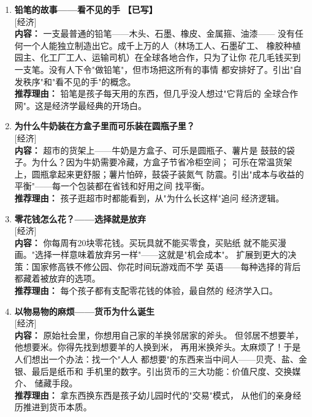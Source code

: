 \documentclass[a4paper,12pt]{ctexart}
\newcommand{\tageconomics}{\textcolor{economics}{\small [经济]}}
\newcommand{\done}{\textcolor{donegreen}{\textbf{【已写】}}}
\begin{document}
\begin{enumerate}

\item[\textbf{第1课}] \textbf{铅笔的故事——看不见的手} \done \\
\tageconomics \\
\textbf{内容：} 一支最普通的铅笔——木头、石墨、橡皮、金属箍、油漆——
没有任何一个人能独立制造出它。成千上万的人（林场工人、石墨矿工、
橡胶种植园主、化工厂工人、运输司机）在全球各地合作，只为了让你
花几毛钱买到一支笔。没有人下令"做铅笔"，但市场把这所有的事情
都安排好了。引出"自发秩序"和"看不见的手"的概念。\\
\textbf{推荐理由：} 铅笔是孩子每天用的东西，但几乎没人想过"它背后的
全球合作网"。这是经济学最经典的开场白。

\item[\textbf{第2课}] \textbf{为什么牛奶装在方盒子里而可乐装在圆瓶子里？} \\
\tageconomics \\
\textbf{内容：} 超市的货架上——牛奶是方盒子、可乐是圆瓶子、薯片是
鼓鼓的袋子。为什么？因为牛奶需要冷藏，方盒子节省冷柜空间；
可乐在常温货架上，圆瓶拿起来更舒服；薯片怕碎，鼓袋子装氮气
防震。引出"成本与收益的平衡"——每一个包装都在省钱和好用之间
找平衡。\\
\textbf{推荐理由：} 孩子逛超市时都能看到，从"为什么长这样"追问
经济逻辑。

\item[\textbf{第3课}] \textbf{零花钱怎么花？——选择就是放弃} \\
\tageconomics \\
\textbf{内容：} 你每周有20块零花钱。买玩具就不能买零食，买贴纸
就不能买漫画。"选择一样意味着放弃另一样"——这就是"机会成本"。
扩展到更大的决策：国家修高铁不修公园、你花时间玩游戏而不学
英语——每种选择的背后都藏着被放弃的选项。\\
\textbf{推荐理由：} 每个孩子都有支配零花钱的体验，最自然的
经济学入口。

\item[\textbf{第4课}] \textbf{以物易物的麻烦——货币为什么诞生} \\
\tageconomics \\
\textbf{内容：} 原始社会里，你想用自己家的羊换邻居家的斧头。
但邻居不想要羊，他想要米。你得先找到想要羊的人换到米，
再用米换斧头。太麻烦了！于是人们想出一个办法：找一个"人人
都想要"的东西来当中间人——贝壳、盐、金银、最后是纸币和
手机里的数字。引出货币的三大功能：价值尺度、交换媒介、
储藏手段。\\
\textbf{推荐理由：} 拿东西换东西是孩子幼儿园时代的"交易"模式，
从他们的亲身经历推进到货币本质。


\end{enumerate}
\end{document}
